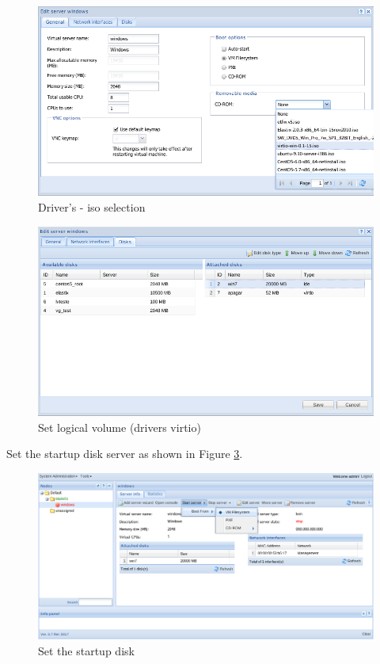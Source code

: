 \begin{figure}[H]
	\begin{center}
	\includegraphics[scale=0.5]{screenshots/virtio/virtio_4.png}
	\caption{Driver's - iso selection}
	\label{fig:virtio4}
	\end{center}
\end{figure}

\begin{figure}[H]
	\begin{center}
	\includegraphics[scale=0.5]{screenshots/virtio/virtio_7.png}
	\caption{Set logical volume (drivers virtio)}
	\label{fig:virtio7}
	\end{center}
\end{figure}

Set the startup disk server as shown in Figure \ref{fig:virtio5}.

\begin{figure}[H]
	\begin{center}
	\includegraphics[scale=0.5]{screenshots/virtio/virtio_5.png}
	\caption{Set the startup disk}
	\label{fig:virtio5}
	\end{center}
\end{figure}

